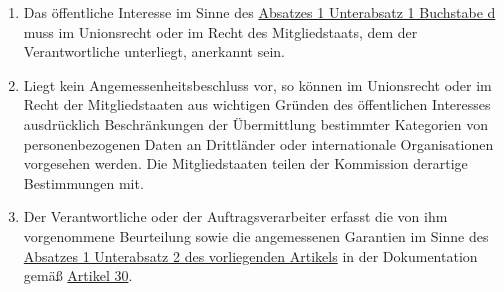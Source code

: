 \begin{enumerate}
  \item Das öffentliche Interesse im Sinne des \hyperref[itm:49-1-1d]{Absatzes 1 Unterabsatz 1 Buchstabe d} muss im
   Unionsrecht oder im Recht des Mitgliedstaats, dem der Verantwortliche unterliegt, anerkannt sein.
  \label{itm:49-4}

  \item Liegt kein Angemessenheitsbeschluss vor, so können im Unionsrecht oder im Recht der Mitgliedstaaten aus
   wichtigen Gründen des öffentlichen Interesses ausdrücklich Beschränkungen der Übermittlung bestimmter Kategorien von
   personenbezogenen Daten an Drittländer oder internationale Organisationen vorgesehen werden. Die Mitgliedstaaten
   teilen der Kommission derartige Bestimmungen mit.
  \label{itm:49-5}

  \item Der Verantwortliche oder der Auftragsverarbeiter erfasst die von ihm vorgenommene Beurteilung sowie die
   angemessenen Garantien im Sinne des \hyperref[itm:49-1-2]{Absatzes 1 Unterabsatz 2 des vorliegenden Artikels} in der
   Dokumentation gemäß \hyperref[ch:30]{Artikel 30}.
  \label{itm:49-6}

\end{enumerate}


